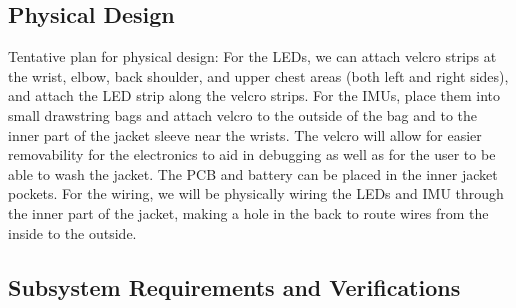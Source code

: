 \documentclass[12pt]{article}
\begin{document}
\subsection{Physical Design}
Tentative plan for physical design: For the LEDs, we can attach velcro strips at the wrist, elbow, back shoulder, and upper chest areas (both left and right sides), and attach the LED strip along the velcro strips. For the IMUs, place them into small drawstring bags and attach velcro to the outside of the bag and to the inner part of the jacket sleeve near the wrists. The velcro will allow for easier removability for the electronics to aid in debugging as well as for the user to be able to wash the jacket. The PCB and battery can be placed in the inner jacket pockets. For the wiring, we will be physically wiring the LEDs and IMU through the inner part of the jacket, making a hole in the back to route wires from the inside to the outside. 
\subsection{Subsystem Requirements and Verifications}
\end{document}
